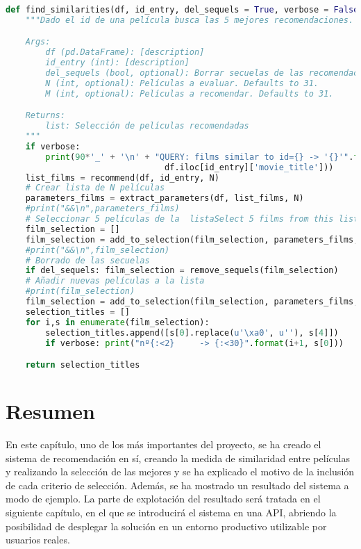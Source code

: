 \begin{lstlisting}[language=Python, caption=Wrapper del pipeline de búsqueda de recomendaciones.]
def find_similarities(df, id_entry, del_sequels = True, verbose = False, N = 31):
    """Dado el id de una película busca las 5 mejores recomendaciones.

    Args:
        df (pd.DataFrame): [description]
        id_entry (int): [description]
        del_sequels (bool, optional): Borrar secuelas de las recomendaciones. Defaults to True.
        N (int, optional): Películas a evaluar. Defaults to 31.
        M (int, optional): Películas a recomendar. Defaults to 31.

    Returns:
        list: Selección de películas recomendadas
    """
    if verbose: 
        print(90*'_' + '\n' + "QUERY: films similar to id={} -> '{}'".format(id_entry,
                                df.iloc[id_entry]['movie_title']))
    list_films = recommend(df, id_entry, N)
    # Crear lista de N películas
    parameters_films = extract_parameters(df, list_films, N)
    #print("&&\n",parameters_films)
    # Seleccionar 5 películas de la  listaSelect 5 films from this list
    film_selection = []
    film_selection = add_to_selection(film_selection, parameters_films, N)
    #print("&&\n",film_selection)
    # Borrado de las secuelas
    if del_sequels: film_selection = remove_sequels(film_selection)
    # Añadir nuevas películas a la lista
    #print(film_selection)
    film_selection = add_to_selection(film_selection, parameters_films, N)
    selection_titles = []
    for i,s in enumerate(film_selection):
        selection_titles.append([s[0].replace(u'\xa0', u''), s[4]])
        if verbose: print("nº{:<2}     -> {:<30}".format(i+1, s[0]))

    return selection_titles
\end{lstlisting}

\section{Resumen}

En este capítulo, uno de los más importantes del proyecto, se ha creado el sistema de recomendación en sí, creando la medida de similaridad entre películas y realizando la selección de las mejores y se ha explicado el motivo de la inclusión de cada criterio de selección. Además, se ha mostrado un resultado del sistema a modo de ejemplo. La parte de explotación del resultado será tratada en el siguiente capítulo, en el que se introducirá el sistema en una API, abriendo la posibilidad de desplegar la solución en un entorno productivo utilizable por usuarios reales.